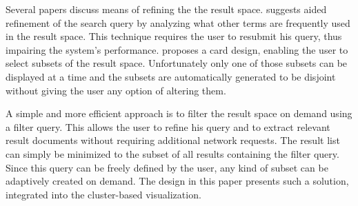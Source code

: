 Several papers discuss means of refining the the result space. \cite{Hoeber2006b} suggests aided refinement of the search query by analyzing what other terms are frequently used in the result space. This technique requires the user to resubmit his query, thus impairing the system's performance. \cite{Mukherjea1999} proposes a card design, enabling the user to select subsets of the result space. Unfortunately only one of those subsets can be displayed at a time and the subsets are automatically generated to be disjoint without giving the user any option of altering them.

A simple and more efficient approach is to filter the result space on demand using a filter query. This allows the user to refine his query and to extract relevant result documents without requiring additional network requests. The result list can simply be minimized to the subset of all results containing the filter query. Since this query can be freely defined by the user, any kind of subset can be adaptively created on demand. The design in this paper presents such a solution, integrated into the cluster-based visualization.